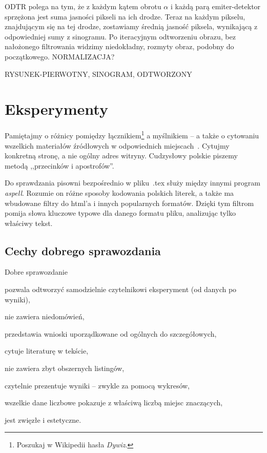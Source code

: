 \documentclass{article}
\begin{document}
ODTR polega na tym, że z każdym kątem obrotu $\alpha$ i każdą parą emiter-detektor sprzężona jest suma jasności pikseli na ich drodze. Teraz na każdym pikselu, znajdującym się na tej drodze, zostawiamy średnią jasność piksela, wynikającą z odpowiedniej sumy z sinogramu. Po iteracyjnym odtworzeniu obrazu, bez nałożonego filtrowania widzimy niedokładny, rozmyty obraz, podobny do początkowego. NORMALIZACJA? 

RYSUNEK-PIERWOTNY, SINOGRAM, ODTWORZONY

\clearpage %


\section{Eksperymenty}
\label{sec-eksperymenty}

Pamiętajmy o różnicy pomiędzy łącznikiem\footnote{Poszukaj w Wikipedii hasła \emph{Dywiz}.} a myślnikiem -- a także o cytowaniu wszelkich materiałów źródłowych w odpowiednich miejscach~\cite{WikiDash}. Cytujmy konkretną stronę, a nie ogólny adres witryny. Cudzysłowy polskie piszemy metodą ,,przecinków i apostrofów''.

Do sprawdzania pisowni bezpośrednio w pliku\ .tex służy między innymi program \emph{aspell}. Rozumie on różne sposoby kodowania polskich literek, a także ma wbudowane filtry do html'a i innych popularnych formatów. Dzięki tym filtrom pomija słowa kluczowe typowe dla danego formatu pliku, analizując tylko właściwy tekst.

\subsection{Cechy dobrego sprawozdania}

Dobre sprawozdanie
\begin{tightlist}
\item pozwala odtworzyć samodzielnie czytelnikowi eksperyment (od danych po wyniki),
\item nie zawiera niedomówień,
\item przedstawia wnioski uporządkowane od ogólnych do szczegółowych,
\item cytuje literaturę w tekście,
\item nie zawiera zbyt obszernych listingów,
\item czytelnie prezentuje wyniki -- zwykle za pomocą wykresów,
\item wszelkie dane liczbowe pokazuje z właściwą liczbą miejsc znaczących,
\item jest zwięzłe i estetyczne.
\end{tightlist}





\end{document}
